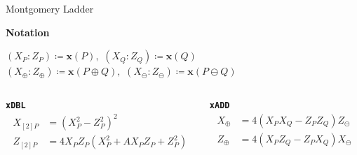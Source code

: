 \begin{frame}{Montgomery Ladder}
    \begin{algorithmblock}
    \textbf{Notation}\\
    \vspace{-1.5em}
    \begin{center}
        $(X_P:Z_P)\coloneqq\textbf{x}(P),$ \quad $(X_Q:Z_Q)\coloneqq\textbf{x}(Q)$ \\
        \vspace{1em}
        $(X_\oplus:Z_\oplus)\coloneqq\textbf{x}(P\oplus Q),$ \quad $(X_\ominus:Z_\ominus)\coloneqq\textbf{x}(P\ominus Q)$
    \end{center}
    \end{algorithmblock}
    \vspace{1em}
    \begin{columns}
        \begin{column}{0.5\textwidth}
            \textbf{\texttt{xDBL}}
            \begin{align*}
                X_{[2]P} &= (X_P^2-Z_P^2)^2 \\
                Z_{[2]P} &= 4X_PZ_P(X_P^2+AX_PZ_P+Z_P^2)
\end{align*}
            
        \end{column}
        \begin{column}{0.5\textwidth}
            \textbf{\texttt{xADD}}
            \begin{align*}
                X_{\oplus} &= 4(X_PX_Q-Z_PZ_Q)Z_{\ominus} \\
                Z_{\oplus} &= 4(X_PZ_Q - Z_PX_Q)X_\ominus
            \end{align*}
        \end{column}
    \end{columns}
\end{frame}

